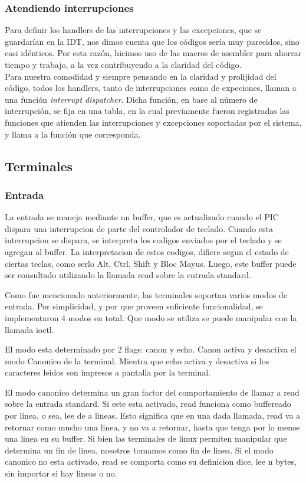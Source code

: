 \documentclass[a4paper,10pt]{article}
\begin{document}
    \subsubsection{Atendiendo interrupciones}
    Para definir los handlers de las interrupciones y las excepciones, que se guardarían en la IDT, nos dimos cuenta que los códigos sería muy parecidos,
    sino casi idénticos. Por esta razón, hicimos uso de las macros de asembler para ahorrar tiempo y trabajo, a la vez
    contribuyendo a la claridad del código.
    \\
    Para nuestra comodidad y siempre pensando en la claridad y prolijidad del código, todos los handlers, tanto de interrupciones
    como de expeciones, llaman a una función \textit{interrupt dispatcher}. Dicha función, en base al número de interrupción, se fija
    en una tabla, en la cual previamente fueron registradas las funciones que atienden las interrupciones y excepciones soportadas
    por el sistema, y llama a la función que corresponda.
    \subsection{Terminales}
        \subsubsection{Entrada}
            La entrada se maneja mediante un buffer, que es actualizado cuando el PIC dispara una interrupcion de parte del controlador de teclado.
            Cuando esta interrupcion se dispara, se interpreta los codigos enviados por el teclado y se agregan al buffer.
            La interpretacion de estos codigos, difiere segun el estado de ciertas teclas, como serlo Alt, Ctrl, Shift y Bloc Mayus.
            Luego, este buffer puede ser consultado utilizando la llamada read sobre la entrada standard.

            Como fue mencionado anteriormente, las terminales soportan varios modos de entrada.
            Por simplicidad, y por que proveen suficiente funcionalidad, se implementaron 4 modos en total.
            Que modo se utiliza se puede manipular con la llamada ioctl.

            El modo esta determinado por 2 flags: canon y echo.
            Canon activa y desactiva el modo Canonico de la terminal.
            Mientra que echo activa y desactiva si los caracteres leidos son impresos a pantalla por la terminal.

            El modo canonico determina un gran factor del comportamiento de llamar a read sobre la entrada standard.
            Si este esta activado, read funciona como buffereado por linea, o sea, lee de a lineas.
            Esto significa que en una dada llamada, read va a retornar como mucho una linea, y no va a retornar, hasta que tenga por lo menos una linea en su buffer.
            Si bien las terminales de linux permiten manipular que determina un fin de linea, nosotros tomamos \n como fin de linea.
            Si el modo canonico no esta activado, read se comporta como su definicion dice, lee n bytes, sin importar si hay lineas o no.
\end{document}
